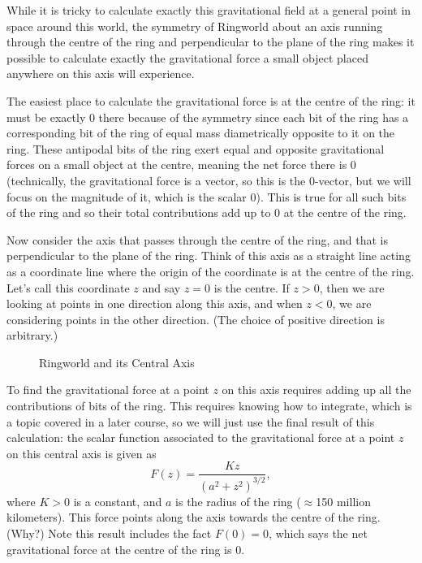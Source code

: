\documentclass{exam}
\begin{document}
\begin{questions}
While it is tricky to calculate exactly this gravitational field at a general point in space around this world, the symmetry of Ringworld about an axis running through the centre of the ring and perpendicular to the plane of the ring makes it possible to calculate exactly the gravitational force a small object placed anywhere on this axis will experience. 

The easiest place to calculate the gravitational force is at the centre of the ring:  it must be exactly 0 there because of the symmetry since each bit of the ring has a corresponding bit of the ring of equal mass diametrically opposite to it on the ring. These antipodal bits of the ring exert equal and opposite gravitational forces on a small object at the centre, meaning the net force there is 0 (technically, the gravitational force is a vector, so this is the 0-vector, but we will focus on the magnitude of it, which is the scalar 0). This is true for all such bits of the ring and so their total contributions add up to 0 at the centre of the ring. 

Now consider the axis that passes through the centre of the ring, and that is perpendicular to the plane of the ring. Think of this axis as a straight line acting as a coordinate line where the origin of the coordinate is at the centre of the ring. Let's call this coordinate $z$ and say $z=0$ is the centre. If $z>0$, then we are looking at points in one direction along this axis, and when $z<0$, we are considering points in the other direction. (The choice of positive direction is arbitrary.) 


\begin{figure}[h]
\begin{center}
\caption{Ringworld and its Central Axis}
\end{center}
\end{figure}



To find the gravitational force at a point $z$ on this axis requires adding up all the contributions of bits of the ring. This requires knowing how to integrate, which is a topic covered in a later course, so we will just use the final result of this calculation: the scalar function associated to the gravitational force at a point $z$ on this central axis is given as $$F(z)=\frac{Kz}{(a^2+z^2)^{3/2}},$$ where $K>0$ is a constant, and $a$ is the radius of the ring ($\approx$150 million kilometers). This force points along the axis towards the centre of the ring. (Why?)  Note this result includes the fact $F(0)=0$, which says the net gravitational force at the centre of the ring is 0. 


\end{questions}
\end{document}

